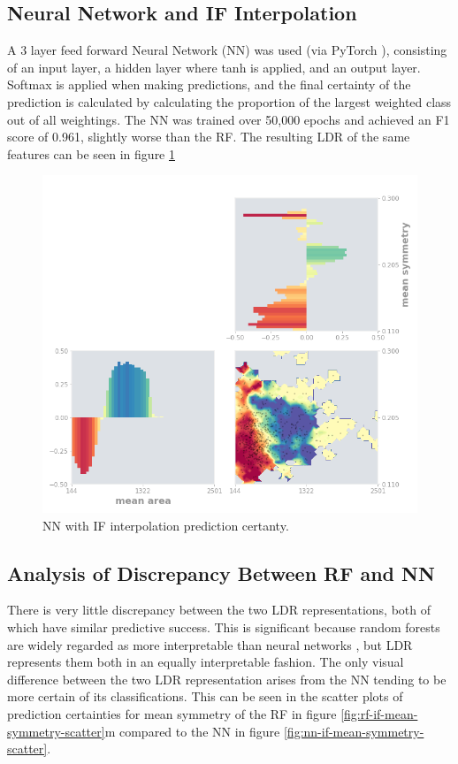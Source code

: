 \documentclass[a4paper, oneside, twocolumn]{article}
\begin{document}
\subsection{Neural Network and IF Interpolation}

A 3 layer feed forward Neural Network (NN) was used (via PyTorch \cite{paszke2017automatic}), consisting of an input layer, a hidden layer where tanh is applied, and an output layer. Softmax is applied when making predictions, and the final certainty of the prediction is calculated by calculating the proportion of the largest weighted class out of all weightings. The NN was trained over 50,000 epochs and achieved an F1 score of 0.961, slightly worse than the RF. The resulting LDR of the same features can be seen in figure \ref{fig:interp-nn-if}

\begin{figure}
\centering
\includegraphics[width=0.8\columnwidth]{img/interp_nn_if.png}
\caption{NN with IF interpolation prediction certanty.}
\label{fig:interp-nn-if}
\end{figure}

\subsection{Analysis of Discrepancy Between RF and NN}

There is very little discrepancy between the two LDR representations, both of which have similar predictive success. This is significant because random forests are widely regarded as more interpretable than neural networks \cite{song2013random}, but LDR represents them both in an equally interpretable fashion. The only visual difference between the two LDR representation arises from the NN tending to be more certain of its classifications. This can be seen in the scatter plots of prediction certainties for mean symmetry of the RF in figure \ref{fig:rf-if-mean-symmetry-scatter}m compared to the NN in figure \ref{fig:nn-if-mean-symmetry-scatter}.
\end{document}
